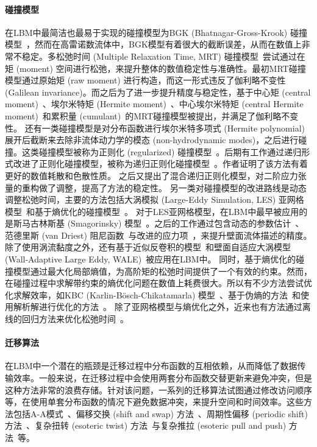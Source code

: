 \paragraph{碰撞模型}
在LBM中最简洁也最易于实现的碰撞模型为BGK (Bhatnagar-Gross-Krook) 碰撞模型~\citep{Chen-1998, Bhatnagar-1954}，然而在高雷诺数流体中，BGK模型有着很大的截断误差，从而在数值上非常不稳定。多松弛时间 (Multiple Relaxation Time, MRT) 碰撞模型~\citep{Coveney-2002, Lallemand-2000, dHumieres-1992}尝试通过在矩 (moment) 空间进行松弛，来提升整体的数值稳定性与准确性。最初MRT碰撞模型通过原始矩 (raw moment) 进行构造，而这一形式违反了伽利略不变性 (Galilean invariance)。而之后为了进一步提升精度与稳定性，基于中心矩 (central moment)~\citep{Geier-2006, Geier-2009}、埃尔米特矩 (Hermite moment)~\citep{Shan-2007, Chen-2014, Adhikari-2008}、中心埃尔米特矩 (central Hermite moment)~\citep{Mattila-2017, Shan-2019}和累积量 (cumulant)~\citep{Geier-2015, Geier-2017}的MRT碰撞模型被提出，并满足了伽利略不变性。
还有一类碰撞模型是对分布函数进行埃尔米特多项式 (Hermite polynomial) 展开后截断来去除非流体动力学的模态 (non-hydrodynamic modes)，之后进行碰撞。这类碰撞模型被称为正则化 (regularized) 碰撞模型~\citep{Zhang-2006, Latt-2006}。后期有工作通过递归形式改进了正则化碰撞模型，被称为递归正则化碰撞模型~\citep{Malaspinas-2015, Coreixas-2017}。作者证明了该方法有着更好的数值耗散和色散性质。\citet{Jacob-2018} 之后又提出了混合递归正则化模型，对二阶应力张量的重构做了调整，提高了方法的稳定性。
另一类对碰撞模型的改进路线是动态调整松弛时间，主要的方法包括大涡模拟 (Large-Eddy Simulation, LES) 亚网格模型~\citep{Eggels-1996, Sagaut-2010}和基于熵优化的碰撞模型~\citep{Karlin-1999, Ansumali-2003}。
对于LES亚网格模型，在LBM中最早被应用的是斯马古林斯基 (Smagorinsky) 模型~\citep{Hou-1994, Krafczyk-2003}。之后的工作通过包含动态的参数估计~\citep{Premnath-2009}、范德里斯 (van Driest) 阻尼函数~\citep{Malaspinas-2014}与改进的应力项~\citep{Leveque-2007}，来提升壁面流体描述的精度。
除了使用涡流黏度之外，还有基于近似反卷积的模型~\citep{Malaspinas-2011, Nathen-2018}和壁面自适应大涡模型 (Wall-Adaptive Large Eddy, WALE)~\citep{Weickert-2010}被应用在LBM中。
同时，基于熵优化的碰撞模型通过最大化局部熵值，为高阶矩的松弛时间提供了一个有效的约束。然而，在碰撞过程中求解带约束的熵优化问题在数值上耗费很大。所以有不少方法尝试优化求解效率，如KBC (Karlin-B\"osch-Chikatamarla) 模型~\citep{Karlin-2014}、基于伪熵的方法~\citep{Kramer-2019}和使用解析解进行优化的方法~\citep{Tang-2022}。
除了亚网格模型与熵优化之外，近来也有方法通过离线的回归方法来优化松弛时间~\citep{Li-2020}。

\paragraph{迁移算法}
在LBM中一个潜在的瓶颈是迁移过程中分布函数的互相依赖，从而降低了数据传输效率。一般来说，在迁移过程中会使用两套分布函数交替更新来避免冲突，但是这种方法非常的浪费存储。针对该问题，一系列的迁移算法试图通过修改访问顺序等，在使用单套分布函数的情况下避免数据冲突，来提升空间和时间效率。这些方法包括A-A模式~\citep{Bailey-2009}、偏移交换 (shift and swap) 方法~\citep{Mohrhard-2019}、周期性偏移 (periodic shift) 方法~\citep{Adrian-2023}、复杂扭转 (esoteric twist) 方法~\citep{Geier-2017-c}与复杂推拉 (esoteric pull and push) 方法~\citep{Moritz-2022}等。

